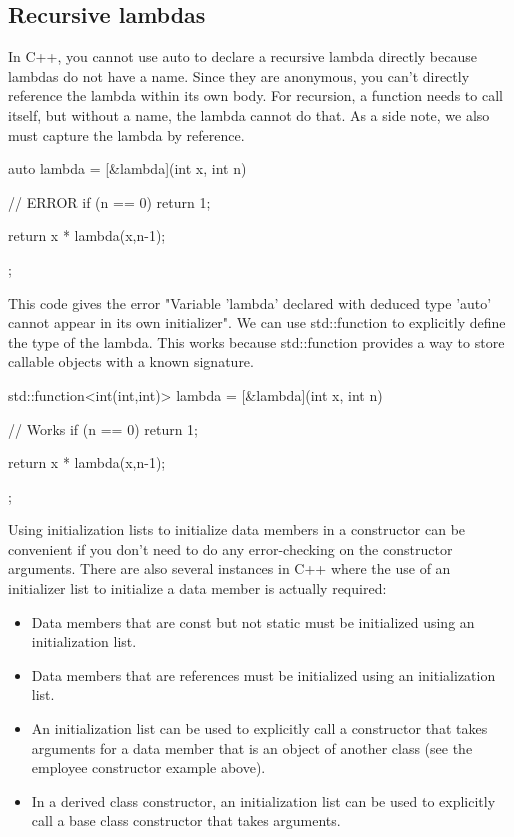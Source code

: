 \documentclass{report}
\begin{document}
     \subsection{Recursive lambdas}
     \bigbreak \noindent 
     In C++, you cannot use auto to declare a recursive lambda directly because lambdas do not have a name. Since they are anonymous, you can't directly reference the lambda within its own body. For recursion, a function needs to call itself, but without a name, the lambda cannot do that.
     \bigbreak \noindent 
     As a side note, we also must capture the lambda by reference.
     \bigbreak \noindent 
     \begin{cppcode}
         auto lambda = [&lambda](int x, int n) { // ERROR 
             if (n == 0) return 1;

             return x * lambda(x,n-1);
        };
     \end{cppcode}
     \bigbreak \noindent 
     This code gives the error "Variable 'lambda' declared with deduced type 'auto' cannot appear in its own initializer".
     \bigbreak \noindent 
     We can use std::function to explicitly define the type of the lambda. This works because std::function provides a way to store callable objects with a known signature.
     \bigbreak \noindent 
     \begin{cppcode}
         std::function<int(int,int)> lambda = [&lambda](int x, int n) { // Works
             if (n == 0) return 1;

             return x * lambda(x,n-1);
         };
     \end{cppcode}






    \pagebreak 
    \bigbreak \noindent 
    Using initialization lists to initialize data members in a constructor can be convenient if you don't need to do any error-checking on the constructor arguments. There are also several instances in C++ where the use of an initializer list to initialize a data member is actually required:

    \begin{itemize}
        \item Data members that are const but not static must be initialized using an initialization list.
        \item Data members that are references must be initialized using an initialization list.
        \item An initialization list can be used to explicitly call a constructor that takes arguments for a data member that is an object of another class (see the employee constructor example above).
        \item In a derived class constructor, an initialization list can be used to explicitly call a base class constructor that takes arguments.
    \end{itemize}
\end{document}
